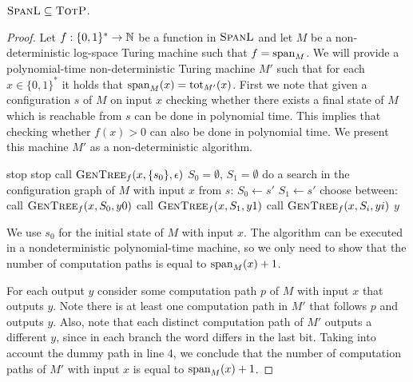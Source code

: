 \begin{theo}
	$\spanl \subseteq \totp$.
\end{theo}
\begin{proof}
	Let $f:\{0,1\}^*\to\N$ be a function in $\spanl$ and let $M$ be a non-deterministic log-space Turing machine such that $f = \sp_M$. We will provide a polynomial-time non-deterministic Turing machine $M'$ such that for each $x\in\{0,1\}^*$ it holds that $\sp_M(x) = \tot_{M'}(x)$. First we note that given a configuration $s$ of $M$ on input $x$ checking whether there exists a final state of $M$ which is reachable from $s$ can be done in polynomial time. This implies that checking whether $f(x) > 0$ can also be done in polynomial time. We present this machine $M'$ as a non-deterministic algorithm.
	
	\begin{algorithm}
		
	\begin{algorithmic}[]
		\Begin
		 stop
		\Else {}
		\State stop
		\State call $\textsc{GenTree}_{f}(x,\{s_0\},\epsilon)$
		\EndIf
		\EndBegin
		\State $S_0 = \emptyset$, $S_1 = \emptyset$
		\State do a search in the configuration graph of $M$ with input $x$ from $s$:
		 $S_0 \gets s'$
		\EndIf
		 $S_1 \gets s'$
		\EndIf
		\EndFor
		 choose between:
		\State call $\textsc{GenTree}_{f}(x,S_0,y0)$
		\State call $\textsc{GenTree}_{f}(x,S_1,y1)$
		\State call $\textsc{GenTree}_{f}(x,S_i,yi)$
		\Return $y$
		\EndIf
		\EndProcedure
	\end{algorithmic}
	
	\end{algorithm}
	
	We use $s_0$ for the initial state of $M$ with input $x$. The algorithm can be executed in a nondeterministic polynomial-time machine, so we only need to show that the number of computation paths is equal to $\sp_M(x)+1$.
	
	For each output $y$ consider some computation path $p$ of $M$ with input $x$ that outputs $y$. Note there is at least one computation path in $M'$ that follows $p$ and outputs $y$. Also, note that each distinct computation path of $M'$ outputs a different $y$, since in each branch the word differs in the last bit. Taking into account the dummy path in line 4, we conclude that the number of computation paths of $M'$ with input $x$ is equal to $\sp_M(x)+1$. 
	
	
	
\end{proof}


